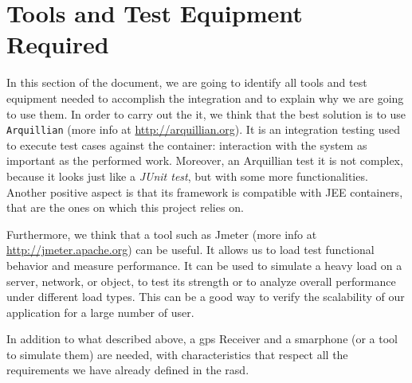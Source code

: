 \section{Tools and Test Equipment Required} \label{sec:tter}

In this section of the document, we are going to identify all tools and test equipment needed to accomplish the integration and to explain why we are going to use them.
In order to carry out the \acl{it}, we think that the best solution is to use \texttt{Arquillian} (more info at \url{http://arquillian.org}). It is an integration testing used to execute test cases against the container: interaction with the system as important as the performed work. Moreover, an Arquillian test it is not complex, because it looks just like a \textit{JUnit test}, but with some more functionalities. Another positive aspect is that its framework is compatible with JEE containers, that are the ones on which this project relies on.
\newline

Furthermore, we think that a tool such as Jmeter (more info at \url{http://jmeter.apache.org}) can be useful. It allows us to load test functional behavior and measure performance. It can be used to simulate a heavy load on a server, network, or object, to test its strength or to analyze overall performance under different load types. This can be a good way to verify the scalability of our application for a large number of user.
\newline

In addition to what described above, a \acs{gps} Receiver and a smarphone (or a tool to simulate them) are needed, with characteristics that respect all the requirements we have already defined in the \acs{rasd}.